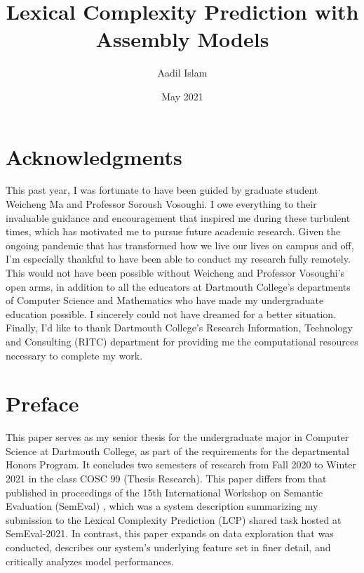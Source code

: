 \documentclass{dcthesis}
\title{Lexical Complexity Prediction with Assembly Models}
\author{Aadil Islam}
\date{May 2021}
\theoremstyle{definition}
\theoremstyle{remark}
\begin{document}
\frontmatter

\maketitle
\restoregeometry

\chapter*{Acknowledgments}
This past year, I was fortunate to have been guided by graduate student Weicheng Ma and Professor Soroush Vosoughi. I owe everything to their invaluable guidance and encouragement that inspired me during these turbulent times, which has motivated me to pursue future academic research. Given the ongoing pandemic that has transformed how we live our lives on campus and off, I'm especially thankful to have been able to conduct my research fully remotely. This would not have been possible without Weicheng and Professor Vosoughi's open arms, in addition to all the educators at Dartmouth College's departments of Computer Science and Mathematics who have made my undergraduate education possible. I sincerely could not have dreamed for a better situation. Finally, I'd like to thank Dartmouth College's Research Information, Technology and Consulting (RITC) department for providing me the computational resources necessary to complete my work. 

\chapter*{Preface}
This paper serves as my senior thesis for the undergraduate major in Computer Science at Dartmouth College, as part of the requirements for the departmental Honors Program. It concludes two semesters of research from Fall 2020 to Winter 2021 in the class COSC 99 (Thesis Research). This paper differs from that published in proceedings of the 15th International Workshop on Semantic Evaluation (SemEval) \citep{islam2021biggreen}, which was a system description summarizing my submission to the Lexical Complexity Prediction (LCP) shared task hosted at SemEval-2021. In contrast, this paper expands on data exploration that was conducted, describes our system's underlying feature set in finer detail, and critically analyzes model performances. 
\end{document}
